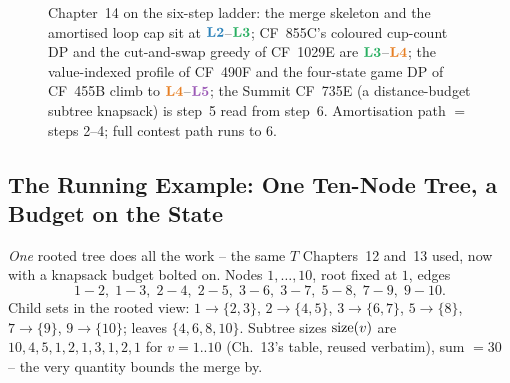 \begin{figure}[H]
\centering
{}
\caption*{Chapter~14 on the six-step ladder: the merge skeleton and the
amortised loop cap sit at $\lv2$--$\lv3$; CF~855C's coloured cup-count DP and
the cut-and-swap greedy of CF~1029E are $\lv3$--$\lv4$; the value-indexed
profile of CF~490F and the four-state game DP of CF~455B climb to $\lv4$--$\lv5$;
the Summit CF~735E (a distance-budget subtree knapsack) is step~5 read from
step~6. Amortisation path $=$ steps 2--4; full contest path runs to 6.}
\end{figure}

\subsection*{The Running Example: One Ten-Node Tree, a Budget on the State}

\emph{One} rooted tree does all the work -- the same $T$ Chapters~12 and~13
used, now with a knapsack budget bolted on. Nodes $1,\dots,10$, root fixed at
$1$, edges
\[
  1\!-\!2,\; 1\!-\!3,\; 2\!-\!4,\; 2\!-\!5,\; 3\!-\!6,\; 3\!-\!7,\; 5\!-\!8,\; 7\!-\!9,\; 9\!-\!10 .
\]
Child sets in the rooted view: $1\!\to\!\{2,3\}$, $2\!\to\!\{4,5\}$,
$3\!\to\!\{6,7\}$, $5\!\to\!\{8\}$, $7\!\to\!\{9\}$, $9\!\to\!\{10\}$; leaves
$\{4,6,8,10\}$. Subtree sizes $\operatorname{size}(v)$ are $10,4,5,1,2,1,3,1,2,1$ for
$v=1..10$ (Ch.~13's table, reused verbatim), sum $=30$ -- the very quantity
 bounds the merge by.

